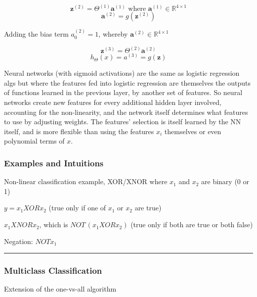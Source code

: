 \documentclass{article}
\begin{document}
\begin{equation}
    \textbf{z}^{(2)} = \Theta^{(1)} \textbf{a}^{(1)}  \text{ where } \textbf{a}^{(1)} \in \mathbb{R}^{4 \times 1}
\end{equation}
\begin{equation}
    \textbf{a}^{(2)} = g \left( \textbf{z}^{(2)} \right)
\end{equation}

Adding the bias term $a_{0}^{(2)} = 1$, whereby $\textbf{a}^{(2)} \in \mathbb{R}^{4 \times 1}$


\begin{equation}
    \textbf{z}^{(3)} = \Theta^{(2)} \textbf{a}^{(2)}
\end{equation}
\begin{equation}
    h_{\Theta}(x) = a^{(3)} = g(\textbf{z})
\end{equation}


Neural networks (with sigmoid activations) are the same as logistic regression algs but where the features fed into logistic regression are themselves the outputs of functions learned in the previous layer, by another set of features. So neural networks create new features for every additional hidden layer involved, accounting for the non-linearity, and the network itself determines what features to use by adjusting weights. The features' selection is itself learned by the NN itself, and is more flexible than using the features $x_i$ themselves or even polynomial terms of $x$.


\subsubsection{Examples and Intuitions}

Non-linear classification example, XOR/XNOR where $x_1$ and $x_2$ are binary (0 or 1)

$y = x_1 XOR x_2$ (true only if one of $x_1$ or $x_2$ are true)

$x_1 XNOR x_2$, which is $NOT \, (x_1 XOR x_2)$ (true only if both are true or both false)


Negation: $NOT x_1$


\par\noindent\rule{\textwidth}{0.4pt}

\subsubsection{Multiclass Classification}

Extension of the one-vs-all algorithm
\end{document}
